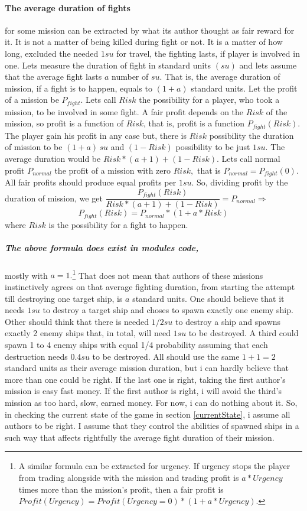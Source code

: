 \documentclass[]{article}
\begin{document}
\paragraph{The average duration of fights} for some mission can be extracted by what its author thought as fair reward for it. It is not a matter of being killed during fight or not. It is a matter of how long, excluded the needed $1su$ for travel, the fighting lasts, if player is involved in one. Lets measure the duration of fight in standard units $(su)$ and lets assume that the average fight lasts $a$ number of $su.$  That is, the average duration of mission, if a fight is to happen, equals to $(1+a)$ standard units. Let the profit of a mission be $P_{fight}.$ Lets call $Risk$ the possibility for a player, who took a mission, to be involved in some fight. A fair profit depends on the $Risk$ of the mission, so profit is a function of $Risk$, that is, profit is a function $P_{fight}(Risk).$ The player gain his profit in any case but, there is $Risk$ possibility the duration of mission to be $(1+a)\,su$ and $(1-Risk)$ possibility to be just $1su.$ The average duration would be $Risk*(a+1)+(1-Risk).$ Lets call normal profit $P_{normal}$ the profit of a mission with zero $Risk,$ that is $P_{normal}=P_{fight}(0).$ All fair profits should produce equal profits per $1su.$ So, dividing profit by the duration of mission, we get  $\dfrac{P_{fight}(Risk)}{Risk*(a+1)+(1-Risk)}=P_{normal} \Rightarrow$ 
\begin{equation}\label{eq:fight_profit}
	 P_{fight}(Risk)=P_{normal}*(1+a*Risk)
\end{equation}
where $Risk$ is the possibility for a fight to happen.
\subparagraph*{The above formula does exist in modules code,} \label{fight_duration}mostly with $a=1.$\footnote{A similar formula can be extracted for urgency. If urgency stops the player from trading alongside with the mission and trading profit is $a*Urgency$ times more than the mission's profit, then a fair profit is $Profit(Urgency)=Profit(Urgency=0)*(1+a*Urgency).$}  That does not mean that  authors of these missions instinctively agrees on that average fighting duration, from starting the attempt till destroying one target ship, is $a$ standard units. One should believe that it needs $1su$ to destroy a target ship and choses to spawn exactly one enemy ship. Other should think that there is needed $1/2su$ to destroy a ship and spawns exactly 2 enemy ships that, in total, will need $1su$ to be destroyed. A third could spawn 1 to 4 enemy ships with equal 1/4 probability assuming that each destruction needs $0.4su$ to be destroyed. All should use the same $1+1=2$ standard units as their average mission duration, but i can hardly believe that more than one could be right. If the last one is right, taking the first author's mission is easy fast money. If the first author is right, i will avoid the third's mission as too hard, slow, earned money. For now, i can do nothing about it. So, in checking the current state of the game in section \ref{currentState}, i assume all authors to be right. I assume that they control the abilities of spawned ships in a such way that affects rightfully the average fight duration of their mission.
\end{document}
